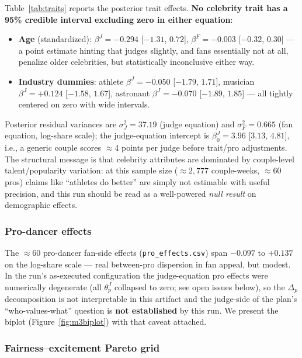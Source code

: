 \documentclass[11pt]{article}
\begin{document}
Table~\ref{tab:traits} reports the posterior trait effects. \textbf{No celebrity trait
has a 95\% credible interval excluding zero in either equation}:
\begin{itemize}[itemsep=1pt]
  \item \textbf{Age} (standardized): $\beta^J = -0.294$ [$-1.31$, $0.72$],
        $\beta^F = -0.003$ [$-0.32$, $0.30$] --- a point estimate hinting that judges
        slightly, and fans essentially not at all, penalize older celebrities, but
        statistically inconclusive either way.
  \item \textbf{Industry dummies}: athlete $\beta^J = -0.050$ [$-1.79$, $1.71$],
        musician $\beta^J = +0.124$ [$-1.58$, $1.67$], astronaut $\beta^J = -0.070$
        [$-1.89$, $1.85$] --- all tightly centered on zero with wide intervals.
\end{itemize}
Posterior residual variances are $\sigma^2_J = 37.19$ (judge equation) and
$\sigma^2_F = 0.665$ (fan equation, log-share scale); the judge-equation intercept is
$\beta^J_0 = 3.96$ [$3.13$, $4.81$], i.e., a generic couple scores $\approx 4$ points
per judge before trait/pro adjustments. The structural message is that celebrity
attributes are dominated by couple-level talent/popularity variation: at this sample
size ($\approx 2{,}777$ couple-weeks, $\approx 60$ pros) claims like ``athletes do
better'' are simply not estimable with useful precision, and this run should be read as
a well-powered \emph{null result} on demographic effects.

\subsubsection{Pro-dancer effects}

The $\approx 60$ pro-dancer fan-side effects (\texttt{pro\_effects.csv}) span
$-0.097$ to $+0.137$ on the log-share scale --- real between-pro dispersion in fan
appeal, but modest. In the run's as-executed configuration the judge-equation pro
effects were numerically degenerate (all $\theta^J_p$ collapsed to zero; see open
issues below), so the $\Delta_p$ decomposition is not interpretable in this artifact
and the judge-side of the plan's ``who-values-what'' question is \textbf{not
established} by this run. We present the biplot (Figure~\ref{fig:m3biplot}) with that
caveat attached.

\subsubsection{Fairness--excitement Pareto grid}
\end{document}
